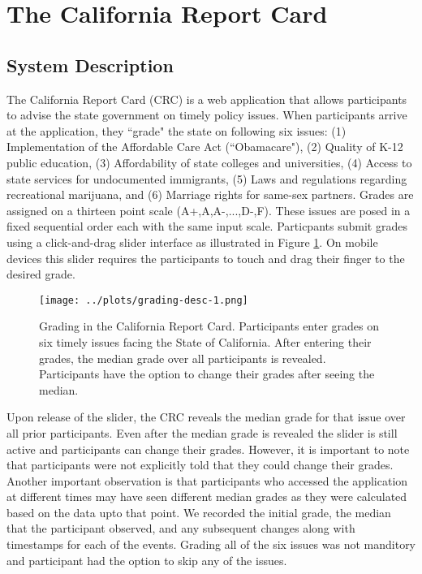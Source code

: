 \section{The California Report Card}
\subsection{System Description}
The California Report Card (CRC) is a web application that allows participants to advise the state government on timely policy issues.
When participants arrive at the application, they ``grade" the state on following six issues: (1) Implementation of the Affordable Care Act (``Obamacare"),
(2) Quality of K-12 public education, (3) Affordability of state colleges and universities, (4) Access to state services for undocumented immigrants, (5) Laws and regulations regarding recreational marijuana, and (6) Marriage rights for same-sex partners.
Grades are assigned on a thirteen point scale (A+,A,A-,...,D-,F).
These issues are posed in a fixed sequential order each with the same input scale.
Particpants submit grades using a click-and-drag slider interface as illustrated in Figure \ref{grading-1}.
On mobile devices this slider requires the participants to touch and drag their finger to the desired grade.

\begin{figure}[h]
  \centering
    \texttt{[image: ../plots/grading-desc-1.png]}
      \caption{Grading in the California Report Card. Participants enter grades on six timely issues facing the State of California. After entering their grades, the median grade over all participants is revealed. Participants have the option to change their grades after seeing the median.}
      \label{grading-1}
\end{figure}

Upon release of the slider, the CRC reveals the median grade for that issue over all prior participants.
Even after the median grade is revealed the slider is still active and participants can change their grades.
However, it is important to note that participants were not explicitly told that they could change their grades.
Another important observation is that participants who accessed the application at different times may have seen different median grades as they were calculated based on the data upto that point.
We recorded the initial grade, the median that the participant observed, and any subsequent changes along with timestamps for each of the events. 
Grading all of the six issues was not manditory and participant had the option to skip any of the issues.

